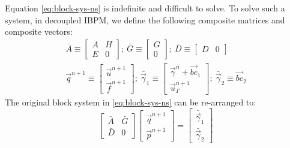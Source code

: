 Equation \ref{eq:block-sys-ns} is indefinite and difficult to solve.
To solve such a system, in decoupled IBPM, we define the following composite matrices and composite vectors: 
\begin{equation}\label{eq:composites}
    \begin{gathered}
        \bar{A} \equiv \begin{bmatrix} A & H \\ E & 0 \end{bmatrix};\
        \bar{G} \equiv \begin{bmatrix} G \\ 0 \end{bmatrix};\
        \bar{D} \equiv \begin{bmatrix} D & 0 \end{bmatrix}
        \\
        \vec{q}^{n+1} \equiv \begin{bmatrix} \vec{u}^{n+1} \\ \vec{f}^{n+1} \end{bmatrix};\
        \bar{\vec{\gamma}}_1 \equiv \begin{bmatrix} \vec{\gamma}^n + \vec{bc}_1 \\ \vec{u}_\Gamma^{n+1}\end{bmatrix};\
        \bar{\vec{\gamma}}_2 \equiv \vec{bc}_2
    \end{gathered}
\end{equation}
The original block system in \eqref{eq:block-sys-ns} can be re-arranged to:
\begin{equation}
    \begin{bmatrix}
        \bar{A} & \bar{G} \\
        \bar{D} & 0
    \end{bmatrix}
    \begin{bmatrix}
        \vec{q}^{n+1} \\
        \vec{p}^{n+1}
    \end{bmatrix}
    =
    \begin{bmatrix}
        \bar{\vec{\gamma}}_1 \\
        \bar{\vec{\gamma}}_2
    \end{bmatrix}
\end{equation}

